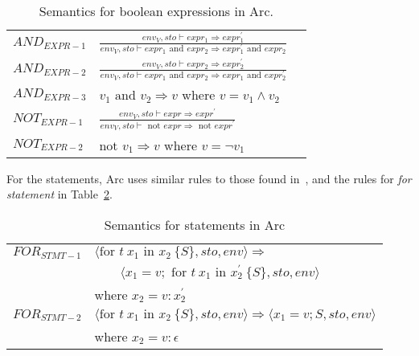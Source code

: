 \begin{table}[htb!]
    \centering
    \begin{tabular}{lll}
        \toprule
        $AND_{EXPR-1}$ & $\frac
            {env_V, sto \vdash expr_1 \Rightarrow expr^\prime_1}
            {env_V, sto \vdash expr_1 \text{ and } expr_2 \Rightarrow expr^\prime_1 \text{ and } expr_2}$ \\ [12pt]
        $AND_{EXPR-2}$ & $\frac
            {env_V, sto \vdash expr_2 \Rightarrow expr^\prime_2}
            {env_V, sto \vdash expr_1 \text{ and } expr_2 \Rightarrow expr_1 \text{ and } expr^\prime_2}$ \\ [12pt]
        $AND_{EXPR-3}$ & $v_1 \text{ and } v_2 \Rightarrow v$ where $ v = v_1 \land v_2$                  \\ [12pt]
        $NOT_{EXPR-1}$ & $\frac
            {env_V, sto \vdash expr \Rightarrow expr^\prime}
            {env_V, sto \vdash \text{ not } expr \Rightarrow \text{ not } expr^\prime}$                   \\ [12pt]
        $NOT_{EXPR-2}$ & $\text{not } v_1 \Rightarrow v$ where $v = \neg v_1 $                            \\
        \bottomrule
    \end{tabular}
    \caption{Semantics for boolean expressions in Arc.}
    \label{tab:booleansemantics}
\end{table}


For the statements, Arc uses similar rules to those found in~\cite[Ch.~10]{Huttel2010}, and the rules for \textit{for statement} in Table~\ref{tab:statementsemantics}.


\begin{table}[htb!]
    \centering
    \begin{tabular}{ll}
        \toprule
        $FOR_{STMT-1}$ & $\langle \text{for } t \ x_1 \text{ in } x_2 \ \{ S \}, sto, env \rangle \Rightarrow$                                      \\
                       & $\qquad \langle x_1 = v; \text{ for } t \ x_1 \text{ in } x^\prime_2 \ \{ S \}, sto, env \rangle$                          \\
                       & where $x_2 = v : x^\prime_2$                                                                                               \\[12pt]
        $FOR_{STMT-2}$ & $\langle \text{for } t \ x_1 \text{ in } x_2 \ \{ S \}, sto, env \rangle \Rightarrow \langle x_1 = v; S, sto, env \rangle$ \\
                       & where $x_2 = v : \epsilon$                                                                                                 \\
        \bottomrule
    \end{tabular}
    \caption{Semantics for statements in Arc}
    \label{tab:statementsemantics}
\end{table}

